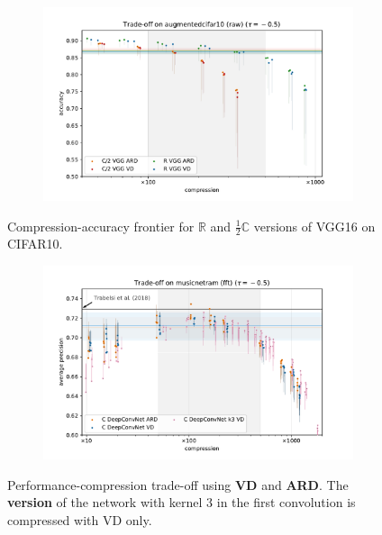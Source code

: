 \documentclass[a4paper,10pt]{article}
\newcommand{\real}{\mathbb{R}}
\newcommand{\cplx}{\mathbb{C}}
\begin{document}
\begin{figure}[!h]
  \centering
  \begin{subfigure}[b]{0.9\textwidth}  %
    \centering
    \includegraphics[width=\linewidth]{../assets/figure__cifar__trade-off/legacy__augmentedcifar10__raw__-0.5.pdf}
  \end{subfigure}
  \caption{%
    Compression-accuracy frontier for $\real$ and $\tfrac12 \cplx$ versions of VGG16 on CIFAR10.
  }
  \label{fig:figure__cifar10__trade-off}
\end{figure}

\begin{figure}[!h]
  \centering
  \begin{subfigure}[b]{1.\textwidth}  %
    \centering
    \includegraphics[width=\linewidth]{../assets/figure__musicnet__trade-off/paper__musicnetram__fft__-0.5.pdf}
  \end{subfigure}
  \caption{%
    Performance-compression trade-off using \textbf{\color{blue} VD} and \textbf{\color{orange} ARD}.
    The \textbf{\color{pink} version} of the network with kernel $3$ in the first convolution is
    compressed with VD only.
  }
  \label{fig:musicnet__trade-off}
\end{figure}
\end{document}
